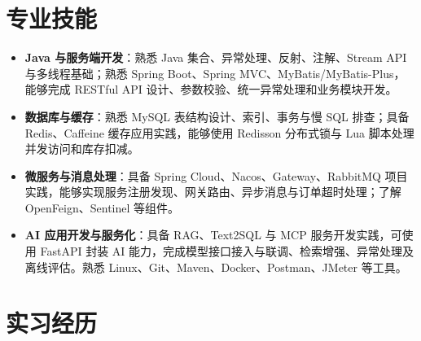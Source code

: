 \documentclass[10pt]{article}
\begin{document}
    \ResumeContactBar
    \ResumeProfileAndEducation


    \section[专业技能]{\makebox[\iconwidth][c]{\color{primarycolor}{\faWrench}}\quad 专业技能}
    \begin{itemize}
        \item \textbf{Java 与服务端开发}：熟悉 Java 集合、异常处理、反射、注解、Stream API 与多线程基础；熟悉 Spring Boot、Spring MVC、MyBatis/MyBatis-Plus，能够完成 RESTful API 设计、参数校验、统一异常处理和业务模块开发。
        \item \textbf{数据库与缓存}：熟悉 MySQL 表结构设计、索引、事务与慢 SQL 排查；具备 Redis、Caffeine 缓存应用实践，能够使用 Redisson 分布式锁与 Lua 脚本处理并发访问和库存扣减。
        \item \textbf{微服务与消息处理}：具备 Spring Cloud、Nacos、Gateway、RabbitMQ 项目实践，能够实现服务注册发现、网关路由、异步消息与订单超时处理；了解 OpenFeign、Sentinel 等组件。
        \item \textbf{AI 应用开发与服务化}：具备 RAG、Text2SQL 与 MCP 服务开发实践，可使用 FastAPI 封装 AI 能力，完成模型接口接入与联调、检索增强、异常处理及离线评估。熟悉 Linux、Git、Maven、Docker、Postman、JMeter 等工具。
        
    \end{itemize}




    \section[实习经历]{\makebox[\iconwidth][c]{\color{primarycolor}{\faBriefcase}}\quad 实习经历}
\end{document}
